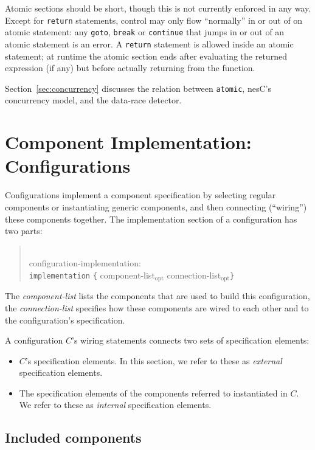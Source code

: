 \documentclass[11pt,letterpaper]{article}
\newcommand{\kw}[1]{{\tt #1}}
\newcommand{\nesc}{nesC\xspace}
\newcommand{\opt}{$_{\mbox{opt}}$\xspace}
\newcommand{\grammarshift}{\vspace*{-.7cm}}
\newcommand{\grammarindent}{\hspace*{2cm}\= \\ \kill}
\begin{document}
Atomic sections should be short, though this is not currently enforced in
any way. Except for \kw{return} statements, control may only flow
``normally'' in or out of on atomic statement: any \kw{goto}, \kw{break} or
\kw{continue} that jumps in or out of an atomic statement is an error. A
\kw{return} statement is allowed inside an atomic statement; at runtime
the atomic section ends after evaluating the returned expression (if any)
but before actually returning from the function.

Section~\ref{sec:concurrency} discusses the relation between \kw{atomic}, 
\nesc's concurrency model, and the data-race detector.

\section{Component Implementation: Configurations}
\label{sec:configuration}

Configurations implement a component specification by selecting regular
components or instantiating generic components, and then connecting
(``wiring'') these components together. The implementation section of
a configuration has two parts:
\begin{quote} \grammarshift \em \begin{tabbing}
\grammarindent
configuration-implementation:\\
\>	\kw{implementation} \kw{\{} component-list\opt connection-list\opt \kw{\}}\\
\end{tabbing} \end{quote}
The \emph{component-list} lists the components that are used to build this
configuration, the \emph{connection-list} specifies how these components
are wired to each other and to the configuration's specification.

A configuration $C$'s wiring statements connects two sets of specification
elements:
\begin{itemize}
\item $C$'s specification elements. In this section, we refer to these as
\emph{external} specification elements.
\item The specification elements of the components referred to instantiated
in $C$. We refer to these as \emph{internal} specification elements.
\end{itemize}

\subsection{Included components}
\label{sec:config-components}
\end{document}
